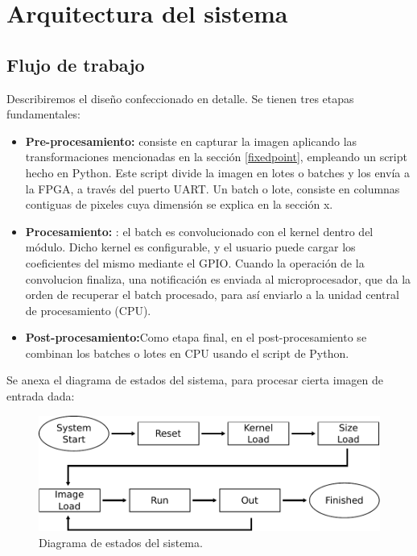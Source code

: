 \documentclass[a4paper]{article}
\begin{document}
\section{Arquitectura del sistema}  \label{arquitectura_sec}
\subsection{Flujo de trabajo}  \label{workflow_subsecc}

Describiremos el diseño confeccionado en detalle. Se tienen tres etapas fundamentales:


\begin{frame}{}

    
      \begin{itemize}
        \item \textbf{Pre-procesamiento:} consiste en capturar la imagen aplicando las transformaciones mencionadas en la sección \ref{fixedpoint}, empleando un script hecho en Python. Este script divide la imagen en lotes o batches y los envía a la FPGA, a través del puerto UART. Un batch o lote, consiste en columnas contiguas de pixeles cuya dimensión se explica en la sección x.
        \item \textbf{Procesamiento:}	: el batch es convolucionado con el kernel dentro del módulo. Dicho kernel es configurable, y el usuario puede cargar los coeficientes del mismo mediante el GPIO. 
Cuando la operación de la convolucion finaliza, una notificación es enviada al microprocesador, que da la orden de recuperar el batch procesado, para así enviarlo a la unidad central de procesamiento (CPU).
       \item \textbf{Post-procesamiento:}Como etapa final, en el post-procesamiento se combinan los batches o lotes en CPU usando el script de Python.
      \end{itemize}
     
\end{frame}


Se anexa el diagrama de estados del sistema, para procesar cierta imagen de entrada dada:\\

\begin{figure}[H]
\centering
\includegraphics[scale=0.7]{states.pdf}
\caption{Diagrama de estados del sistema.}
\label{statesfig}
\end{figure}
\end{document}
